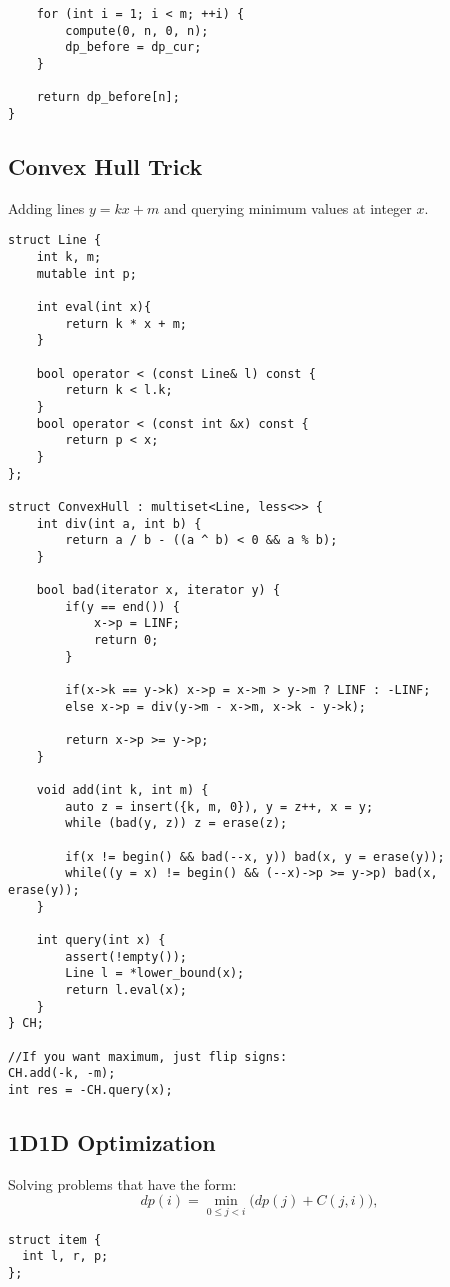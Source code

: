 \documentclass[11pt,a4paper]{article}
\begin{document}
\begin{multicols*}{2}
\begin{lstlisting}
    for (int i = 1; i < m; ++i) {
        compute(0, n, 0, n);
        dp_before = dp_cur;
    }

    return dp_before[n];
}
\end{lstlisting}

\subsection{Convex Hull Trick}
Adding lines $y = kx + m$ and querying minimum values at integer $x$.
\begin{lstlisting}
struct Line {
    int k, m;
    mutable int p;
    
    int eval(int x){
    	return k * x + m;
    }
    
    bool operator < (const Line& l) const {
        return k < l.k;
    }
    bool operator < (const int &x) const {
        return p < x;
    }
};
 
struct ConvexHull : multiset<Line, less<>> {
    int div(int a, int b) {
        return a / b - ((a ^ b) < 0 && a % b);
    }

    bool bad(iterator x, iterator y) {
        if(y == end()) { 
            x->p = LINF;
            return 0; 
        }

        if(x->k == y->k) x->p = x->m > y->m ? LINF : -LINF;
        else x->p = div(y->m - x->m, x->k - y->k);

        return x->p >= y->p;
    }

    void add(int k, int m) {
        auto z = insert({k, m, 0}), y = z++, x = y;
        while (bad(y, z)) z = erase(z);

        if(x != begin() && bad(--x, y)) bad(x, y = erase(y));
        while((y = x) != begin() && (--x)->p >= y->p) bad(x, erase(y));
    }

    int query(int x) {
        assert(!empty());
        Line l = *lower_bound(x);
        return l.eval(x);
    }
} CH;

//If you want maximum, just flip signs: 
CH.add(-k, -m);
int res = -CH.query(x);
\end{lstlisting}

\subsection{1D1D Optimization}
Solving problems that have the form: 
\[
dp(i) = \min_{0 \leq j < i} \Big( dp(j) + C(j, i) \Big),
\]
\begin{lstlisting}
struct item {
  int l, r, p;
};


\end{lstlisting}
\end{multicols*}
\end{document}
